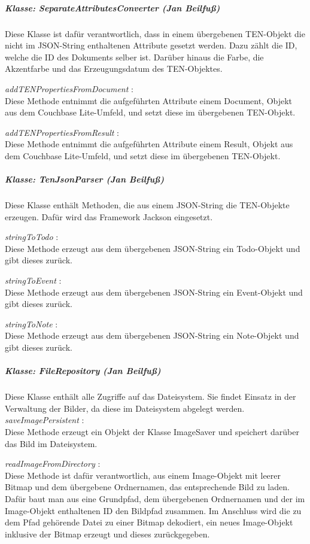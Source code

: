 \subparagraph{Klasse: SeparateAttributesConverter (Jan Beilfuß)}
Diese Klasse ist dafür verantwortlich, dass in einem übergebenen TEN-Objekt die nicht im JSON-String enthaltenen Attribute gesetzt werden. Dazu zählt die ID, welche die ID des Dokuments selber ist. Darüber hinaus die Farbe, die Akzentfarbe und das Erzeugungsdatum des TEN-Objektes.

\textit{ addTENPropertiesFromDocument }:\\
Diese Methode entnimmt die aufgeführten Attribute einem Document, Objekt aus dem Couchbase Lite-Umfeld, und setzt diese im übergebenen TEN-Objekt.

\textit{ addTENPropertiesFromResult }:\\
Diese Methode entnimmt die aufgeführten Attribute einem Result, Objekt aus dem Couchbase Lite-Umfeld, und setzt diese im übergebenen TEN-Objekt.

\subparagraph{Klasse: TenJsonParser (Jan Beilfuß)}
Diese Klasse enthält Methoden, die aus einem JSON-String die TEN-Objekte erzeugen. Dafür wird das Framework Jackson eingesetzt.

\textit{ stringToTodo }:\\
Diese Methode erzeugt aus dem übergebenen JSON-String ein Todo-Objekt und gibt dieses zurück.

\textit{ stringToEvent }:\\
Diese Methode erzeugt aus dem übergebenen JSON-String ein Event-Objekt und gibt dieses zurück.

\textit{ stringToNote }:\\
Diese Methode erzeugt aus dem übergebenen JSON-String ein Note-Objekt und gibt dieses zurück.

\subparagraph{Klasse: FileRepository (Jan Beilfuß)}
Diese Klasse enthält alle Zugriffe auf das Dateisystem. Sie findet Einsatz in der Verwaltung der Bilder, da diese im Dateisystem abgelegt werden.
\textit{ saveImagePersistent }:\\
Diese Methode erzeugt ein Objekt der Klasse ImageSaver und speichert darüber das Bild im Dateisystem.

\textit{ readImageFromDirectory }:\\
Diese Methode ist dafür verantwortlich, aus einem Image-Objekt mit leerer Bitmap und dem übergebene Ordnernamen, das entsprechende Bild zu laden. Dafür baut man aus eine Grundpfad, dem übergebenen Ordnernamen und der im Image-Objekt enthaltenen ID den Bildpfad zusammen. Im Anschluss wird die zu dem Pfad gehörende Datei zu einer Bitmap dekodiert, ein neues Image-Objekt inklusive der Bitmap erzeugt und dieses zurückgegeben.

